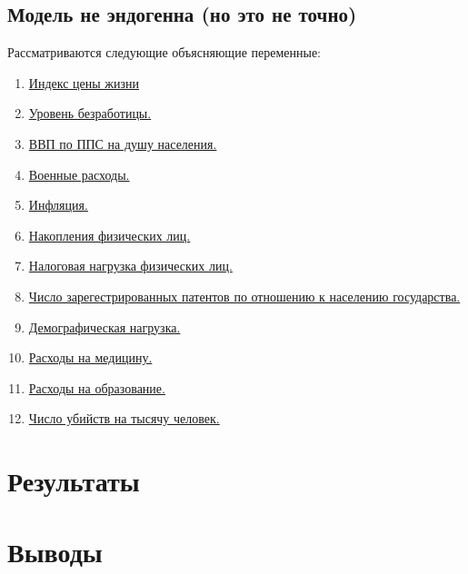 \documentclass[russian]{vegareport}
\begin{document}
        \section{Модель не эндогенна (но это не точно)}
        Рассматриваются следующие объясняющие переменные:
        \begin{enumerate}
            \item \href{https://www.kaggle.com/datasets/mvieira101/global-cost-of-living}{Индекс цены жизни}
            \item \href{https://data.worldbank.org/indicator/GB.XPD.RSDV.GD.ZS?view=chart}{Уровень безработицы.}
            \item \href{https://data.worldbank.org/indicator/NY.GDP.PCAP.PP.CD}{ВВП по ППС на душу населения.}
            \item \href{https://data.worldbank.org/indicator/MS.MIL.XPND.GD.ZS}{Военные расходы.}
            \item \href{https://data.worldbank.org/indicator/FP.CPI.TOTL.ZG?view=chart}{Инфляция.}
            \item \href{https://data.worldbank.org/indicator/NY.GNS.ICTR.ZS?view=chart}{Накопления физических лиц.}
            \item \href{https://data.worldbank.org/indicator/IC.TAX.TOTL.CP.ZS?view=chart}{Налоговая нагрузка физических лиц.}
            \item \href{}{Число зарегестрированных патентов по отношению к населению государства.}
            \item \href{https://data.worldbank.org/indicator/SP.POP.DPND}{Демографическая нагрузка.}
            \item \href{https://data.worldbank.org/indicator/SH.XPD.CHEX.GD.ZS}{Расходы на медицину.}
            \item \href{https://data.worldbank.org/indicator/SE.XPD.TOTL.GD.ZS?view=chart }{Расходы на образование.}
            \item \href{https://data.worldbank.org/indicator/VC.IHR.PSRC.P5}{Число убийств на тысячу человек.}
        \end{enumerate}

    \chapter{Результаты}
        
    \chapter{Выводы}
\end{document}
